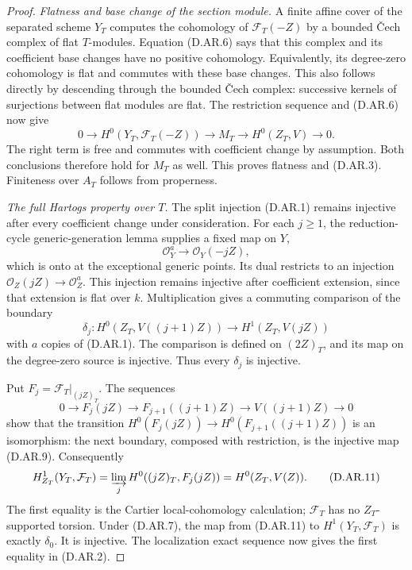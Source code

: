 \begin{proof}
\emph{Flatness and base change of the section module.}
A finite affine cover of the separated scheme $Y_T$
computes the cohomology of $\mathcal F_T(-Z)$ by a bounded
Čech complex of flat $T$-modules. Equation (D.AR.6) says that
this complex and its coefficient base changes have no
positive cohomology. Equivalently, its degree-zero
cohomology is flat and commutes with these base changes.
This also follows directly by descending through the bounded
Čech complex: successive kernels of surjections between
flat modules are flat. The restriction sequence and
(D.AR.6) now give
\[
 0\longrightarrow H^0(Y_T,\mathcal F_T(-Z))
 \longrightarrow M_T
 \longrightarrow H^0(Z_T,V)\longrightarrow0.
                                                        \tag{D.AR.8}
\]
The right term is free and commutes with coefficient change
by assumption. Both conclusions therefore hold for $M_T$
as well. This proves flatness and (D.AR.3). Finiteness over
$A_T$ follows from properness.

\emph{The full Hartogs property over $T$.}
The split injection (D.AR.1) remains injective after every
coefficient change under consideration. For each $j\ge1$,
the reduction-cycle generic-generation lemma supplies a
fixed map on $Y$,
\[
 \mathcal O_Y^a\longrightarrow\mathcal O_Y(-jZ),
\]
which is onto at the exceptional generic points. Its dual
restricts to an injection
$\mathcal O_Z(jZ)\to\mathcal O_Z^a$. This injection remains
injective after coefficient extension, since that extension
is flat over $k$. Multiplication gives a commuting comparison
of the boundary
\[
 \delta_j:H^0(Z_T,V((j+1)Z))
                \longrightarrow H^1(Z_T,V(jZ))
                                                        \tag{D.AR.9}
\]
with $a$ copies of (D.AR.1). The comparison is defined on
$(2Z)_T$, and its map on the degree-zero source is injective.
Thus every $\delta_j$ is injective.

Put $F_j=\mathcal F_T|_{(jZ)_T}$. The sequences
\[
 0\longrightarrow F_j(jZ)
 \longrightarrow F_{j+1}((j+1)Z)
 \longrightarrow V((j+1)Z)\longrightarrow0
                                                        \tag{D.AR.10}
\]
show that the transition
$H^0(F_j(jZ))\to H^0(F_{j+1}((j+1)Z))$
is an isomorphism: the next boundary, composed with
restriction, is the injective map (D.AR.9).
Consequently
\[
 H^1_{Z_T}(Y_T,\mathcal F_T)
  =\varinjlim_j H^0((jZ)_T,F_j(jZ))
  =H^0(Z_T,V(Z)).
                                                        \tag{D.AR.11}
\]
The first equality is the Cartier local-cohomology
calculation; $\mathcal F_T$ has no $Z_T$-supported torsion.
Under (D.AR.7), the map from (D.AR.11) to
$H^1(Y_T,\mathcal F_T)$ is exactly $\delta_0$.
It is injective. The localization exact sequence now gives
the first equality in (D.AR.2).


\end{proof}
